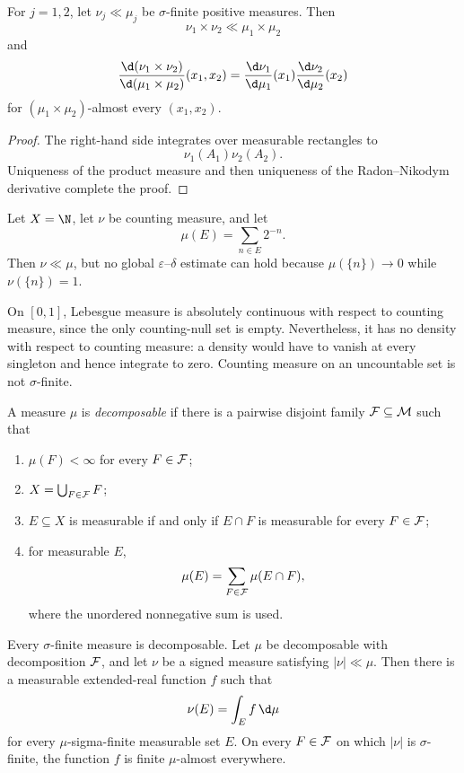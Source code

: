 \begin{prop}
For $j=1,2$, let $\nu_j\ll\mu_j$ be $\sigma$-finite positive measures. Then
\[
\nu_1\times\nu_2\ll\mu_1\times\mu_2
\]
and
\[
\frac{\d(\nu_1\times\nu_2)}{\d(\mu_1\times\mu_2)}(x_1,x_2)
 =\frac{\d\nu_1}{\d\mu_1}(x_1)
  \frac{\d\nu_2}{\d\mu_2}(x_2)
\]
for $(\mu_1\times\mu_2)$-almost every $(x_1,x_2)$.
\end{prop}

\begin{proof}
The right-hand side integrates over measurable rectangles to
\[
\nu_1(A_1)\nu_2(A_2).
\]
Uniqueness of the product measure and then uniqueness of the Radon--Nikodym derivative complete the proof.
\end{proof}

\begin{eg}
Let $X=\N$, let $\nu$ be counting measure, and let
\[
\mu(E)=\sum_{n\in E}2^{-n}.
\]
Then $\nu\ll\mu$, but no global $\varepsilon$--$\delta$ estimate can hold because $\mu(\{n\})\to0$ while $\nu(\{n\})=1$.

On $[0,1]$, Lebesgue measure is absolutely continuous with respect to counting measure, since the only counting-null set is empty. Nevertheless, it has no density with respect to counting measure: a density would have to vanish at every singleton and hence integrate to zero. Counting measure on an uncountable set is not $\sigma$-finite.
\end{eg}

\begin{de}
A measure $\mu$ is \emph{decomposable} if there is a pairwise disjoint family $\mathcal{F}\subseteq\mathcal{M}$ such that
\begin{enumerate}
  \item $\mu(F)<\infty$ for every $F\in\mathcal{F}$;
  \item $X=\bigcup_{F\in\mathcal{F}}F$;
  \item $E\subseteq X$ is measurable if and only if $E\cap F$ is measurable for every $F\in\mathcal{F}$;
  \item for measurable $E$,
  \[
  \mu(E)=\sum_{F\in\mathcal{F}}\mu(E\cap F),
  \]
  where the unordered nonnegative sum is used.
\end{enumerate}
\end{de}

\begin{prop}
Every $\sigma$-finite measure is decomposable. Let $\mu$ be decomposable with decomposition $\mathcal{F}$, and let $\nu$ be a signed measure satisfying $|\nu|\ll\mu$. Then there is a measurable extended-real function $f$ such that
\[
\nu(E)=\int_Ef\,\d\mu
\]
for every $\mu$-sigma-finite measurable set $E$. On every $F\in\mathcal{F}$ on which $|\nu|$ is $\sigma$-finite, the function $f$ is finite $\mu$-almost everywhere.
\end{prop}

